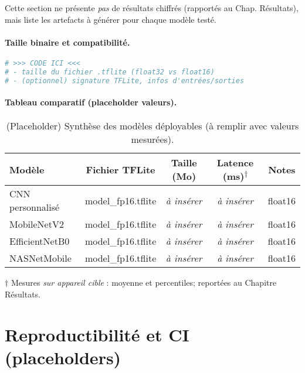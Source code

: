Cette section ne présente \emph{pas} de résultats chiffrés (rapportés au Chap. Résultats), mais liste les artefacts à générer pour chaque modèle testé.

\paragraph{Taille binaire et compatibilité.}
\begin{lstlisting}[language=bash,caption={(Placeholder) Rapport de taille et compatibilité modèles},label={lst:size_report}]
# >>> CODE ICI <<<
# - taille du fichier .tflite (float32 vs float16)
# - (optionnel) signature TFLite, infos d'entrées/sorties
\end{lstlisting}

\paragraph{Tableau comparatif (placeholder valeurs).}
\begin{table}[h!]
\centering
\caption{(Placeholder) Synthèse des modèles déployables (à remplir avec valeurs mesurées).}
\label{tab:deploy_synthese}
\begin{tabular}{@{}lcccc@{}}
\toprule
Modèle & Fichier TFLite & Taille (Mo) & Latence (ms)\textsuperscript{$\dagger$} & Notes \\ \midrule
CNN personnalisé & model\_fp16.tflite & \textit{à insérer} & \textit{à insérer} & float16 \\
MobileNetV2      & model\_fp16.tflite & \textit{à insérer} & \textit{à insérer} & float16 \\
EfficientNetB0   & model\_fp16.tflite & \textit{à insérer} & \textit{à insérer} & float16 \\
NASNetMobile     & model\_fp16.tflite & \textit{à insérer} & \textit{à insérer} & float16 \\ \bottomrule
\end{tabular}

\begin{flushleft}
\footnotesize{$\dagger$ Mesures \emph{sur appareil cible} : moyenne et percentiles; reportées au Chapitre Résultats.}
\end{flushleft}
\end{table}

\section{Reproductibilité et CI (placeholders)}
\label{sec:ci_repro}

